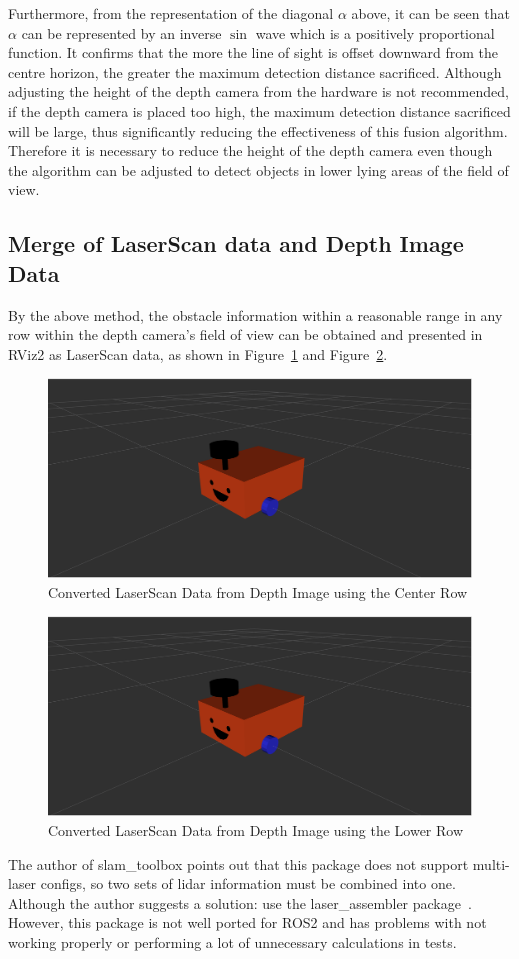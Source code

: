 Furthermore, from the representation of the diagonal $\alpha$ above, 
it can be seen that $\alpha$ can be represented by an inverse $\sin$ wave which is a positively proportional function. 
It confirms that the more the line of sight is offset downward from the centre horizon, 
the greater the maximum detection distance sacrificed. 
Although adjusting the height of the depth camera from the hardware is not recommended, 
if the depth camera is placed too high, the maximum detection distance sacrificed will be large, 
thus significantly reducing the effectiveness of this fusion algorithm. 
Therefore it is necessary to reduce the height of the depth camera even though the algorithm can be adjusted to detect objects in lower lying areas of the field of view.

\subsection{Merge of LaserScan data and Depth Image Data}
By the above method, the obstacle information 
within a reasonable range in any row within the depth camera's field of view can be obtained and presented
in RViz2 as LaserScan data, as shown in Figure~\ref{fig:centre_row} and Figure~\ref{fig:lower_row}.
\begin{figure}[H]
    \centering
    \includegraphics[width=0.8\linewidth]{figs/robot.png}
    \caption{Converted LaserScan Data from Depth Image using the Center Row}
    \label{fig:centre_row}
\end{figure}
\begin{figure}[H]
    \centering
    \includegraphics[width=0.8\linewidth]{figs/robot.png}
    \caption{Converted LaserScan Data from Depth Image using the Lower Row}
    \label{fig:lower_row}
\end{figure}
The author of slam\_toolbox points out that this package does not support multi-laser configs, 
so two sets of lidar information must be combined into one. 
Although the author suggests a solution: use the laser\_assembler package~\cite{github}.
However, this package is not well ported for ROS2
and has problems with not working properly or performing a lot of unnecessary calculations in tests. 

